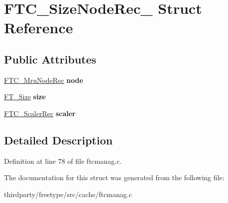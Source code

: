 \hypertarget{struct_f_t_c___size_node_rec__}{}\section{F\+T\+C\+\_\+\+Size\+Node\+Rec\+\_\+ Struct Reference}
\label{struct_f_t_c___size_node_rec__}
\subsection*{Public Attributes}
\begin{DoxyCompactItemize}
\item 
\mbox{\label{struct_f_t_c___size_node_rec___aa5f6e70ce1df0eee0a2c7b8712e1465d}} 
\hyperlink{struct_f_t_c___mru_node_rec__}{F\+T\+C\+\_\+\+Mru\+Node\+Rec} {\bfseries node}
\item 
\mbox{\label{struct_f_t_c___size_node_rec___a09254f7f7154266fa9d71bd94ca80d69}} 
\hyperlink{struct_f_t___size_rec__}{F\+T\+\_\+\+Size} {\bfseries size}
\item 
\mbox{\label{struct_f_t_c___size_node_rec___ac26844d2ec4f3659694d630a988cdf22}} 
\hyperlink{struct_f_t_c___scaler_rec__}{F\+T\+C\+\_\+\+Scaler\+Rec} {\bfseries scaler}
\end{DoxyCompactItemize}


\subsection{Detailed Description}


Definition at line 78 of file ftcmanag.\+c.



The documentation for this struct was generated from the following file\+:\begin{DoxyCompactItemize}
\item 
thirdparty/freetype/src/cache/ftcmanag.\+c\end{DoxyCompactItemize}
